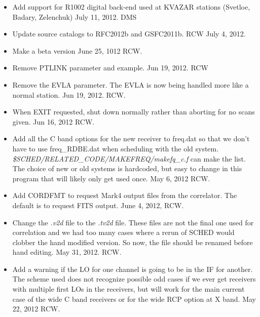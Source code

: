 \documentclass{report}
\begin{document}
\begin{itemize}



\item Add support for R1002 digital back-end used at KVAZAR stations
(Svetloe, Badary, Zelenchuk) July 11, 2012. DMS

\item Update source catalogs to RFC2012b and GSFC2011b.  RCW  July 4, 2012.

\item Make a beta version June 25, 1012  RCW.

\item Remove PTLINK parameter and example.  Jun 19, 2012. RCW

\item Remove the EVLA parameter.  The EVLA is now being handled more
like a normal station.  Jun 19, 2012.  RCW.

\item When EXIT requested, shut down normally rather than aborting
for no scans given.  Jun 16, 2012  RCW.

\item Add all the C band options for the new receiver to freq.dat
so that we don't have to use freq\_RDBE.dat when scheduling with the
old system.  {\sl \$SCHED/RELATED\_CODE/MAKEFREQ/makefq\_c.f} can make the
list.  The choice of new or old systems is hardcoded, but easy to
change in this program that will likely only get used once. 
May 6, 2012 RCW.

\item Add CORDFMT to request Mark4 output files from the correlator.
The default is to request FITS output.  June 4, 2012, RCW.

\item Change the {\sl .v2d} file to the {\sl .tv2d} file.  These files
are not the final one used for correlation and we had too many cases
where a rerun of SCHED would clobber the hand modified version.  So
now, the file should be renamed before hand editing.  May 31, 2012.  RCW.

\item Add a warning if the LO for one channel is going to be in the
IF for another.  The scheme used does not recognize possible odd cases
if we ever get receivers with multiple first LOs in the receivers,
but will work for the main current case of the wide C band receivers 
or for the wide RCP option at X band.  May 22, 2012  RCW.


\end{itemize}
\end{document}
